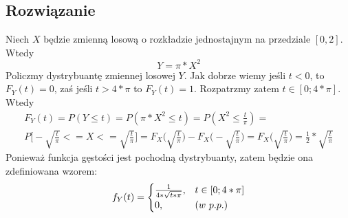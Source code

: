 \documentclass[10pt, a4paper]{article}
\begin{document}
\subsection*{Rozwiązanie}
Niech $X$ będzie zmienną losową o rozkładzie jednostajnym na przedziale $[0,2]$. Wtedy
\begin{equation}
Y = \pi * X^2
\end{equation}
Policzmy dystrybuantę zmiennej losowej $Y$. Jak dobrze wiemy jeśli $t < 0$, to $F_Y(t) = 0$, zaś jeśli $t > 4 * \pi$ to $F_Y(t) = 1$. Rozpatrzmy zatem $t \in [0; 4*\pi]$. Wtedy
\begin{align*}
F_Y(t) = P(Y \leq t) = P(\pi * X^2 \leq t) = P(X^2 \leq \frac{t}{\pi}) = \\ P\Big[-\sqrt{\frac{t}{\pi}} <= X <= \sqrt{\frac{t}{\pi}}\Big] = F_X\Big(\sqrt{\frac{t}{\pi}}\Big) - F_X\Big(-\sqrt{\frac{t}{\pi}}\Big) = F_X\Big(\sqrt{\frac{t}{\pi}}\Big) = \frac{1}{2} * \sqrt{\frac{t}{\pi}}
\end{align*}
Ponieważ funkcja gęstości jest pochodną dystrybuanty, zatem będzie ona zdefiniowana wzorem:
\begin{equation}
f_Y(t) =  \begin{cases}
         \frac{1}{4 * \sqrt{t * \pi}}, & t \in [0; 4*\pi]\\
        0, & \text(w\ p.p.)
  		\end{cases}
\end{equation}
\end{document}
